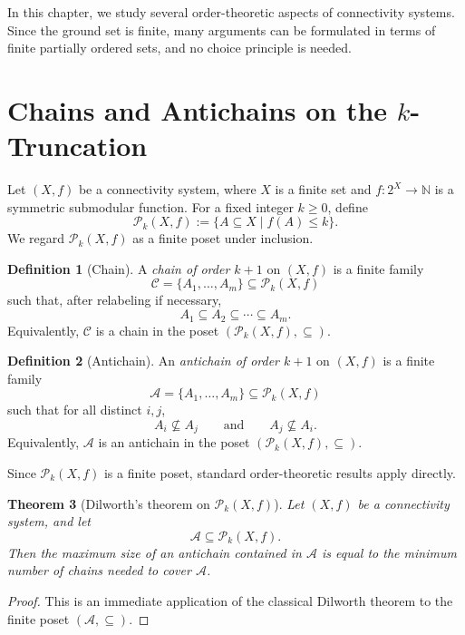 \documentclass[10pt]{book}
\newtheorem{theorem}{Theorem}[section]
\theoremstyle{definition}
\newtheorem{definition}[theorem]{Definition}
\begin{document}
In this chapter, we study several order-theoretic aspects of connectivity systems.
Since the ground set is finite, many arguments can be formulated in terms of finite partially ordered sets, and no choice principle is needed.

\section{Chains and Antichains on the \(k\)-Truncation}

Let \((X,f)\) be a connectivity system, where \(X\) is a finite set and
\(f:2^X\to \mathbb{N}\) is a symmetric submodular function.
For a fixed integer \(k\geq 0\), define
\[
\mathcal{P}_k(X,f):=\{A\subseteq X \mid f(A)\leq k\}.
\]
We regard \(\mathcal{P}_k(X,f)\) as a finite poset under inclusion.

\begin{definition}[Chain]
\label{def:chain_connectivity}
A \emph{chain of order \(k+1\)} on \((X,f)\) is a finite family
\[
\mathcal{C}=\{A_1,\dots,A_m\}\subseteq \mathcal{P}_k(X,f)
\]
such that, after relabeling if necessary,
\[
A_1 \subseteq A_2 \subseteq \cdots \subseteq A_m.
\]
Equivalently, \(\mathcal{C}\) is a chain in the poset \((\mathcal{P}_k(X,f),\subseteq)\).
\end{definition}

\begin{definition}[Antichain]
\label{def:antichain_connectivity}
An \emph{antichain of order \(k+1\)} on \((X,f)\) is a finite family
\[
\mathcal{A}=\{A_1,\dots,A_m\}\subseteq \mathcal{P}_k(X,f)
\]
such that for all distinct \(i,j\),
\[
A_i \nsubseteq A_j
\qquad\text{and}\qquad
A_j \nsubseteq A_i.
\]
Equivalently, \(\mathcal{A}\) is an antichain in the poset \((\mathcal{P}_k(X,f),\subseteq)\).
\end{definition}

Since \(\mathcal{P}_k(X,f)\) is a finite poset, standard order-theoretic results apply directly.

\begin{theorem}[Dilworth's theorem on \(\mathcal{P}_k(X,f)\)]
\label{thm:dilworth_connectivity}
Let \((X,f)\) be a connectivity system, and let
\[
\mathcal{A}\subseteq \mathcal{P}_k(X,f).
\]
Then the maximum size of an antichain contained in \(\mathcal{A}\) is equal to the minimum number of chains needed to cover \(\mathcal{A}\).
\end{theorem}

\begin{proof}
This is an immediate application of the classical Dilworth theorem to the finite poset \((\mathcal{A},\subseteq)\).
\end{proof}
\end{document}
